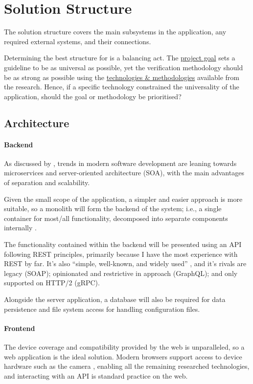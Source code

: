 \section{Solution Structure}

The solution structure covers the main subsystems in the
application, any required external systems, and their
connections.

Determining the best structure for \projectname{} is a
balancing act.
The \hyperref[ss:goal]{project goal} sets a guideline to be
as universal as possible, yet the verification methodology
should be as strong as possible using the
\hyperref[s:concept]{technologies \& methodologies}
available from the research.
Hence, if a specific technology constrained the
universality of the application, should the goal or
methodology be prioritised?

\subsection{Architecture}

\paragraph{Backend}
As discussed by \cite{soaVsMicroservices}, trends in modern
software development are leaning towards microservices and
server-oriented architecture (SOA), with the main
advantages of separation and scalability.

Given the small scope of the \projectname{} application, a
simpler and easier approach is more suitable, so a monolith
will form the backend of the \projectname{} system; i.e., a
single container for most/all functionality, decomposed
into separate components internally \parencite{monoliths}.

The functionality contained within the backend will be
presented using an API following REST principles, primarily
because I have the most experience with REST by far.
It's also \enquote{simple, well-known, and widely used}
\parencite{protocols}, and it's rivals are legacy (SOAP);
opinionated and restrictive in approach (GraphQL); and only
supported on HTTP/2 (gRPC).

Alongside the server application, a database will also be
required for data persistence and file system access for
handling configuration files.

\paragraph{Frontend}
The device coverage and compatibility provided by the web
is unparalleled, so a web application is the ideal
solution.
Modern browsers support access to device hardware such as
the camera \parencite{browserCamera}, enabling all the
remaining researched technologies, and interacting with an
API is standard practice on the web.

